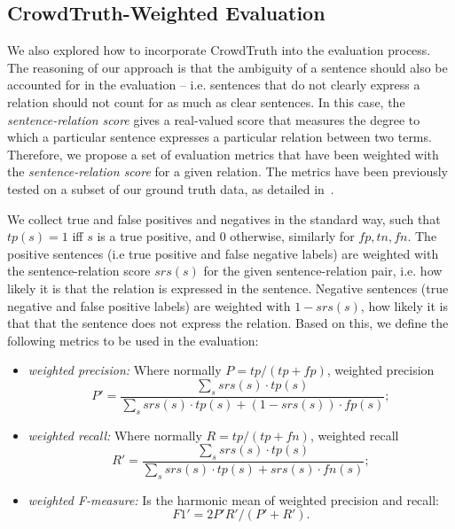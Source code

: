 \subsection{CrowdTruth-Weighted Evaluation}

We also explored how to incorporate CrowdTruth into the evaluation process. The reasoning of our approach is that the ambiguity of a sentence should also be accounted for in the evaluation -- i.e. sentences that do not clearly express a relation should not count for as much as clear sentences. In this case, the \textit{sentence-relation score} gives a real-valued score that measures the degree to which a particular sentence expresses a particular relation between two terms. Therefore, we propose a set of evaluation metrics that have been weighted with the \textit{sentence-relation score} for a given relation. The metrics have been previously tested on a subset of our ground truth data, as detailed in~\cite{dumitrache2015a}.

We collect true and false positives and negatives in the standard way, such that $tp(s) = 1 $ iff $s$ is a true positive, and $0$ otherwise, similarly for $fp, tn, fn$. The positive sentences (i.e true positive and false negative labels) are weighted with the sentence-relation score $srs(s)$ for the given sentence-relation pair, i.e. how likely it is that the relation is expressed in the sentence. Negative sentences (true negative and false positive labels) are weighted with $1 - srs(s)$, how likely it is that that the sentence does not express the relation. Based on this, we define the following metrics to be used in the evaluation: 
 

\begin{itemize}

\item \textit{weighted precision:}   Where normally $P = tp/(tp + fp)$, weighted precision $$P' = \dfrac{\sum_{s}{srs(s) \cdot tp(s)}} {\sum_{s}{srs(s) \cdot tp(s) + (1 - srs(s)) \cdot fp(s)}};$$

\item \textit{weighted recall:} Where normally $R = tp/(tp + fn)$, weighted recall $$R' = \dfrac{\sum_{s}{srs(s) \cdot tp(s)}}{\sum_{s}{srs(s) \cdot tp(s) + srs(s) \cdot fn(s)}};$$

\item \textit{weighted F-measure:} Is the harmonic mean of weighted precision and recall: $$F1' = 2 P' R' / (P' + R').$$

\end{itemize}


